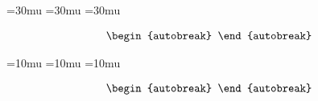 \documentclass{article}
\begin{document}
\thickmuskip=30mu
\medmuskip=30mu
\thinmuskip=30mu

\begin{align}
  \begin{autobreak}
    
  \end{autobreak}
\end{align}

\Huge
\thickmuskip=10mu
\medmuskip=10mu
\thinmuskip=10mu

\begin{align}
  \begin{autobreak}
    
  \end{autobreak}
\end{align}
\end{document}

